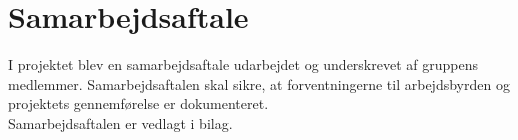 \section{Samarbejdsaftale}
I projektet blev en samarbejdsaftale udarbejdet og underskrevet af gruppens medlemmer. 
Samarbejdsaftalen skal sikre, at forventningerne til arbejdsbyrden og projektets gennemførelse er dokumenteret. \\
Samarbejdsaftalen er vedlagt i bilag. 

\clearpage
